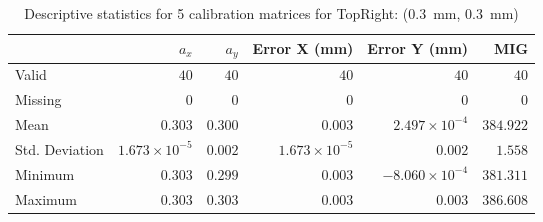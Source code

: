 \begin{table}[h]
    \begin{subtable}{\textwidth}
        \centering
        \footnotesize
        \begin{tabular}{lrrrrr}
            \toprule
                & $a_x$ & $a_y$ & Error X (mm) & Error Y (mm) & MIG  \\
            \midrule
			Valid & $40$ & $40$ & $40$ & $40$ & $40$  \\
			Missing & $0$ & $0$ & $0$ & $0$ & $0$  \\
			Mean & $0.303$ & $0.300$ & $0.003$ & $2.497\times10^{-4}$ & $384.922$  \\
			Std. Deviation & $1.673\times10^{-5}$ & $0.002$ & $1.673\times10^{-5}$ & $0.002$ & $1.558$  \\
			Minimum & $0.303$ & $0.299$ & $0.003$ & $-8.060\times10^{-4}$ & $381.311$  \\
			Maximum & $0.303$ & $0.303$ & $0.003$ & $0.003$ & $386.608$  \\
            \bottomrule
        \end{tabular}
        \caption{$T_{Avg}$}
        \end{subtable}

    \caption{Descriptive statistics for 5 calibration matrices for \textsf{TopRight:} (\SI{0.3}{\milli\meter}, \SI{0.3}{\milli\meter})}
    \label{table:stats_matrix_topright}
\end{table}

